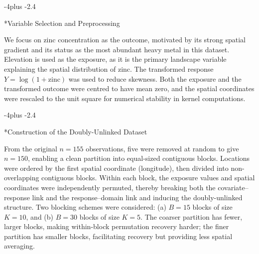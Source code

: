 \documentclass[numsec,webpdf,modern,medium,namedate]{oup-authoring-template}
\makeatletter
\theoremstyle{thmstyleone}%
\theoremstyle{thmstyletwo}%
\theoremstyle{thmstylethree}%
\def\subsection{%
  \@startsection{subsection}{2}{\z@}
  {-4\p@ plus -2\p@}{\if@traditional.4\p@\else2\p@\fi}
  {\reset@font\raggedright\subsecsize}}
\makeatother
\begin{document}
\subsection*{Variable Selection and Preprocessing}

We focus on zinc concentration as the outcome, motivated by its strong spatial gradient and its status as the most abundant heavy metal in this dataset. Elevation is used as the exposure, as it is the primary landscape variable explaining the spatial distribution of zinc. The transformed response $Y = \log(1 + \text{zinc})$ was used to reduce skewness. Both the exposure and the transformed outcome were centred to have mean zero, and the spatial coordinates were rescaled to the unit square for numerical stability in kernel computations.

\subsection*{Construction of the Doubly-Unlinked Dataset}

From the original $n = 155$ observations, five were removed at random to give $n = 150$, enabling a clean partition into equal-sized contiguous blocks. Locations were ordered by the first spatial coordinate (longitude), then divided into non-overlapping contiguous blocks. Within each block, the exposure values and spatial coordinates were independently permuted, thereby breaking both the covariate--response link and the response--domain link and inducing the doubly-unlinked structure. Two blocking schemes were considered: (a) $B = 15$ blocks of size $K = 10$, and (b) $B = 30$ blocks of size $K = 5$. The coarser partition has fewer, larger blocks, making within-block permutation recovery harder; the finer partition has smaller blocks, facilitating recovery but providing less spatial averaging.



\end{document}
